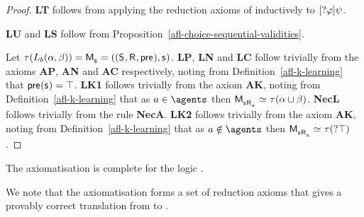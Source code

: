\begin{proof}
{\bf LT} follows from applying the reduction axioms of \axiomAmlK{} inductively to ${[ {?{\varphi}} ]} \psi$.

{\bf LU} and {\bf LS} follow from Proposition~\ref{afl-choice-sequential-validities}.

Let $\tau(\learnsB (\alpha, \beta)) = \aPModel{\aStateS} = \aPModelTuple{\aStateS}$.
{\bf LP}, {\bf LN} and {\bf LC} follow trivially from the \axiomAmlK{} axioms {\bf AP}, {\bf AN} and {\bf AC} respectively, noting from Definition~\ref{afl-k-learning} that $\aPrecondition(\aStateS) = \top$.
{\bf LK1} follows trivially from the \axiomAmlK{} axiom {\bf AK}, noting from Definition~\ref{afl-k-learning} that as $\agentA \in \agents$ then $\aPModel{\aStateS \aAccessibility{\agentA}} \bisimilar \tau(\alpha \choice \beta)$.
{\bf NecL} follows trivially from the \axiomAmlK{} rule {\bf NecA}.
{\bf LK2} follows trivially from the \axiomAmlK{} axiom {\bf AK}, noting from Definition~\ref{afl-k-learning} that as $\agentA \notin \agents$ then $\aPModel{\aStateS \aAccessibility{\agentA}} \bisimilar \tau(\test{\top})$.
\end{proof}

\begin{proposition}\label{afl-k-axioms-completeness}
The axiomatisation \axiomAflK{} is complete for the logic \logicAmlK{}.
\end{proposition}

We note that the axiomatisation \axiomAflK{} forms a set of reduction axioms that gives a provably correct translation from \langAfl{} to \lang{}.

